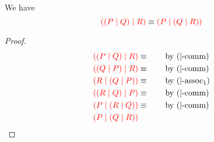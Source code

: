 \begin{lemma}[\ncEquivPoolAssNoParen2]\label{thm:nc-pool-assoc2}
  We have
  \[
    \textcolor{red}{((P \mid Q) \mid R)} \equiv
    \textcolor{red}{(P \mid (Q \mid R))}
  \]
\end{lemma}
\begin{proof}
  \begin{align*}
    \textcolor{red}{((P \mid Q) \mid R)} &\equiv \qquad \text{by \ensuremath{(|\text{-comm})}} \\
    \textcolor{red}{((Q \mid P) \mid R)} &\equiv \qquad \text{by \ensuremath{(|\text{-comm})}} \\
    \textcolor{red}{(R \mid (Q \mid P))} &\equiv \qquad \text{by \ensuremath{(|\text{-assoc}_1)}} \\
    \textcolor{red}{((R \mid Q) \mid P)} &\equiv \qquad \text{by \ensuremath{(|\text{-comm})}} \\
    \textcolor{red}{(P \mid (R \mid Q))} &\equiv \qquad \text{by \ensuremath{(|\text{-comm})}} \\
    \textcolor{red}{(P \mid (Q \mid R))}
  \end{align*}
\end{proof}
